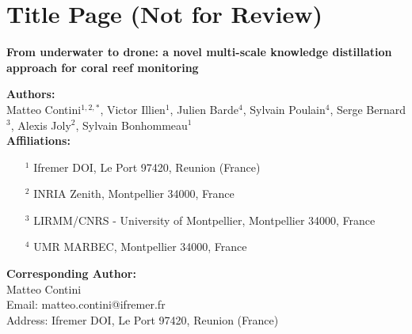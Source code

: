 \documentclass[11pt, a4paper]{article}
\begin{document}
\section*{Title Page (Not for Review)}

\textbf{\LARGE From underwater to drone: a novel multi-scale knowledge distillation approach for coral reef monitoring}

\bigskip
\textbf{Authors:}\\
Matteo Contini$^{1,2,*}$, Victor Illien$^1$, Julien Barde$^4$, Sylvain Poulain$^4$, Serge Bernard$^3$, Alexis Joly$^2$, Sylvain Bonhommeau$^1$ \\
\bigskip
\textbf{Affiliations:}
\begin{itemize}
    \item[$^1$] Ifremer DOI, Le Port 97420, Reunion (France)
    \item[$^2$] INRIA Zenith, Montpellier 34000, France
    \item[$^3$] LIRMM/CNRS - University of Montpellier, Montpellier 34000, France
    \item[$^4$] UMR MARBEC, Montpellier 34000, France
\end{itemize}

\bigskip
\textbf{Corresponding Author:}\\
Matteo Contini\\
Email: matteo.contini@ifremer.fr\\
Address: Ifremer DOI, Le Port 97420, Reunion (France)\\
\end{document}
